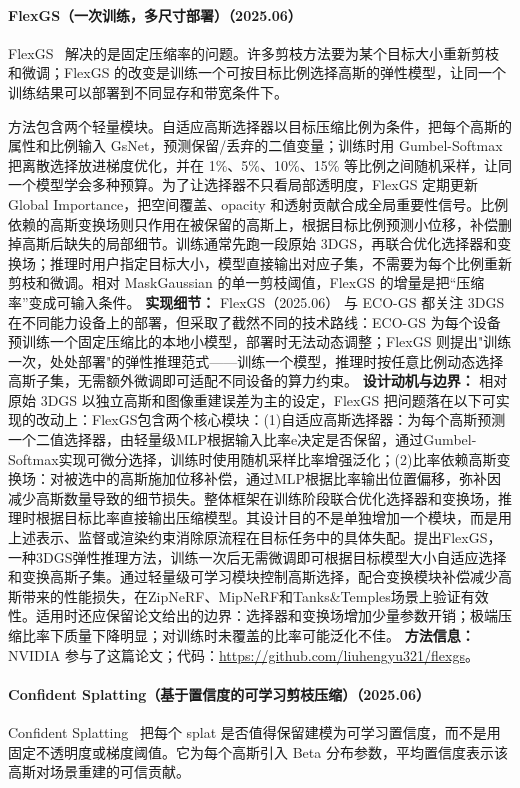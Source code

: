 \paragraph{FlexGS（一次训练，多尺寸部署）（2025.06）}
FlexGS~\cite{2506_04174} 解决的是固定压缩率的问题。许多剪枝方法要为某个目标大小重新剪枝和微调；FlexGS 的改变是训练一个可按目标比例选择高斯的弹性模型，让同一个训练结果可以部署到不同显存和带宽条件下。

方法包含两个轻量模块。自适应高斯选择器以目标压缩比例为条件，把每个高斯的属性和比例输入 GsNet，预测保留/丢弃的二值变量；训练时用 Gumbel-Softmax 把离散选择放进梯度优化，并在 1\%、5\%、10\%、15\% 等比例之间随机采样，让同一个模型学会多种预算。为了让选择器不只看局部透明度，FlexGS 定期更新 Global Importance，把空间覆盖、opacity 和透射贡献合成全局重要性信号。比例依赖的高斯变换场则只作用在被保留的高斯上，根据目标比例预测小位移，补偿删掉高斯后缺失的局部细节。训练通常先跑一段原始 3DGS，再联合优化选择器和变换场；推理时用户指定目标大小，模型直接输出对应子集，不需要为每个比例重新剪枝和微调。相对 MaskGaussian 的单一剪枝阈值，FlexGS 的增量是把“压缩率”变成可输入条件。
\textbf{实现细节：} FlexGS（2025.06） 与 ECO-GS 都关注 3DGS 在不同能力设备上的部署，但采取了截然不同的技术路线：ECO-GS 为每个设备预训练一个固定压缩比的本地小模型，部署时无法动态调整；FlexGS 则提出"训练一次，处处部署"的弹性推理范式——训练一个模型，推理时按任意比例动态选择高斯子集，无需额外微调即可适配不同设备的算力约束。
\textbf{设计动机与边界：} 相对原始 3DGS 以独立高斯和图像重建误差为主的设定，FlexGS 把问题落在以下可实现的改动上：FlexGS包含两个核心模块：(1)自适应高斯选择器：为每个高斯预测一个二值选择器，由轻量级MLP根据输入比率e决定是否保留，通过Gumbel-Softmax实现可微分选择，训练时使用随机采样比率增强泛化；(2)比率依赖高斯变换场：对被选中的高斯施加位移补偿，通过MLP根据比率输出位置偏移，弥补因减少高斯数量导致的细节损失。整体框架在训练阶段联合优化选择器和变换场，推理时根据目标比率直接输出压缩模型。其设计目的不是单独增加一个模块，而是用上述表示、监督或渲染约束消除原流程在目标任务中的具体失配。提出FlexGS，一种3DGS弹性推理方法，训练一次后无需微调即可根据目标模型大小自适应选择和变换高斯子集。通过轻量级可学习模块控制高斯选择，配合变换模块补偿减少高斯带来的性能损失，在ZipNeRF、MipNeRF和Tanks\&Temples场景上验证有效性。适用时还应保留论文给出的边界：选择器和变换场增加少量参数开销；极端压缩比率下质量下降明显；对训练时未覆盖的比率可能泛化不佳。
\textbf{方法信息：} NVIDIA 参与了这篇论文；代码：\url{https://github.com/liuhengyu321/flexgs}。



\paragraph{Confident Splatting（基于置信度的可学习剪枝压缩）（2025.06）}
Confident Splatting~\cite{2506_22973} 把每个 splat 是否值得保留建模为可学习置信度，而不是用固定不透明度或梯度阈值。它为每个高斯引入 Beta 分布参数，平均置信度表示该高斯对场景重建的可信贡献。

